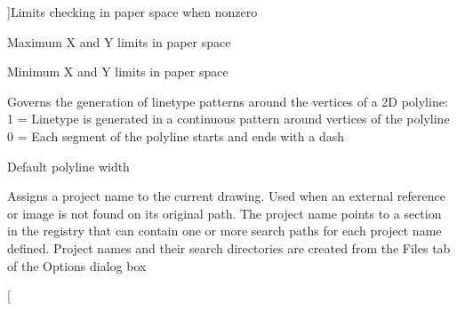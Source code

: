 \begin{Desc}
\begin{description}
{}]Limits checking in paper space when nonzero \item[{\em 
P\+L\+I\+M\+M\+AX\hypertarget{class_c_a_d_header_abd894aab7aa85b4c4634e67fb93d6886a5aa564a99534fc8d583117f95fba5395}{}\label{class_c_a_d_header_abd894aab7aa85b4c4634e67fb93d6886a5aa564a99534fc8d583117f95fba5395}
}]Maximum X and Y limits in paper space \item[{\em 
P\+L\+I\+M\+M\+IN\hypertarget{class_c_a_d_header_abd894aab7aa85b4c4634e67fb93d6886adea675c00346f03ebf5ce19e83a5b0fa}{}\label{class_c_a_d_header_abd894aab7aa85b4c4634e67fb93d6886adea675c00346f03ebf5ce19e83a5b0fa}
}]Minimum X and Y limits in paper space \item[{\em 
P\+L\+I\+N\+E\+G\+EN\hypertarget{class_c_a_d_header_abd894aab7aa85b4c4634e67fb93d6886a717cfd50b8c6710d7b63ed252871c0fc}{}\label{class_c_a_d_header_abd894aab7aa85b4c4634e67fb93d6886a717cfd50b8c6710d7b63ed252871c0fc}
}]Governs the generation of linetype patterns around the vertices of a 2D polyline\+: 1 = Linetype is generated in a continuous pattern around vertices of the polyline 0 = Each segment of the polyline starts and ends with a dash \item[{\em 
P\+L\+I\+N\+E\+W\+ID\hypertarget{class_c_a_d_header_abd894aab7aa85b4c4634e67fb93d6886a6fa1bcddff8cd3b096f64643d7eb2d93}{}\label{class_c_a_d_header_abd894aab7aa85b4c4634e67fb93d6886a6fa1bcddff8cd3b096f64643d7eb2d93}
}]Default polyline width \item[{\em 
P\+R\+O\+J\+E\+C\+T\+N\+A\+ME\hypertarget{class_c_a_d_header_abd894aab7aa85b4c4634e67fb93d6886ac9b6ac3088c11c3e386dd220eff6ed5a}{}\label{class_c_a_d_header_abd894aab7aa85b4c4634e67fb93d6886ac9b6ac3088c11c3e386dd220eff6ed5a}
}]Assigns a project name to the current drawing. Used when an external reference or image is not found on its original path. The project name points to a section in the registry that can contain one or more search paths for each project name defined. Project names and their search directories are created from the Files tab of the Options dialog box \item[{\em 
}
\end{description}
\end{Desc}

